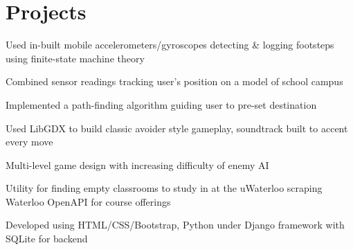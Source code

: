 \documentclass[letterpaper]{deedy-resume}
\begin{document}
\begin{minipage}[t]{0.66\textwidth}

\section{Projects}


\begin{tightitemize}
\item Used in-built mobile accelerometers/gyroscopes detecting \& logging footsteps using finite-state machine theory
\item Combined sensor readings tracking user’s position on a model of school campus 
\item Implemented a path-finding algorithm guiding user to pre-set destination 
\end{tightitemize}

\sectionspace %



\begin{tightitemize}
\item Used LibGDX to build classic avoider style gameplay, soundtrack built to accent every move
\item Multi-level game design with increasing difficulty of enemy AI
\end{tightitemize}

\sectionspace %



\begin{tightitemize}
\item Utility for finding empty classrooms to study in at the uWaterloo scraping Waterloo OpenAPI for course offerings
\item Developed using HTML/CSS/Bootstrap, Python under Django framework with SQLite for backend
\end{tightitemize}


\end{minipage}
\end{document}
